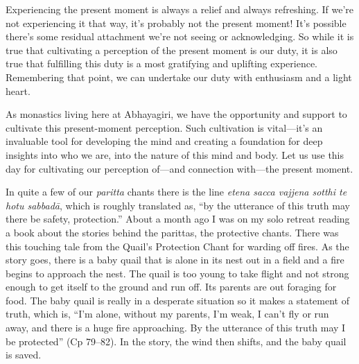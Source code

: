 Experiencing the present moment is always a relief and always 
refreshing. If we're not experiencing it that way, it's probably not 
the present moment! It's possible there's some residual attachment 
we're not seeing or acknowledging. So while it is true that cultivating 
a perception of the present moment is our duty, it is also true that 
fulfilling this duty is a most gratifying and uplifting experience. 
Remembering that point, we can undertake our duty with enthusiasm and a 
light heart.

As monastics living here at Abhayagiri, we have the opportunity and 
support to cultivate this present-moment perception. Such cultivation 
is vital---it's an invaluable tool for developing the mind and creating 
a foundation for deep insights into who we are, into the nature of this 
mind and body. Let us use this day for cultivating our perception 
of---and connection with---the present moment.


In quite a few of our \emph{paritta} chants there is the line 
\emph{etena sacca vajjena sotthi te hotu sabbadā}, which is roughly 
translated as, ``by the utterance of this truth may there be safety, 
protection.'' About a month ago I was on my solo retreat reading a book 
about the stories behind the parittas, the protective chants. There was 
this touching tale from the Quail's Protection Chant for warding off 
fires. As the story goes, there is a baby quail that is alone in its 
nest out in a field and a fire begins to approach the nest. The quail 
is too young to take flight and not strong enough to get itself to the 
ground and run off. Its parents are out foraging for food. The baby 
quail is really in a desperate situation so it makes a statement of 
truth, which is, ``I'm alone, without my parents, I'm weak, I can't fly 
or run away, and there is a huge fire approaching. By the utterance of 
this truth may I be protected'' (Cp 79–82). In the story, the wind 
then shifts, and the baby quail is saved.


